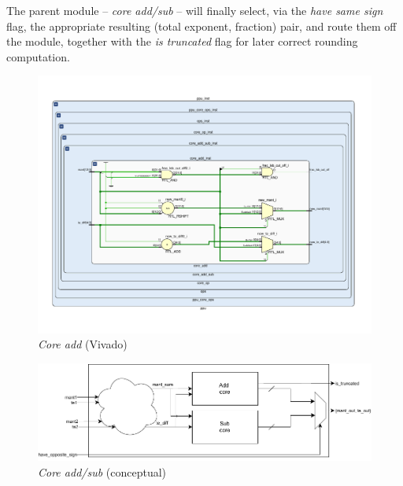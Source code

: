 The parent module -- \textit{core add/sub} -- will finally select, via the \textit{have same sign} flag, the appropriate resulting (total exponent, fraction) pair, and route them off the module, together with the \textit{is truncated} flag for later correct rounding computation.

\begin{figure}
    \centering
    \includegraphics[width=\textwidth]{figures/core_add_vivado.pdf}
    \caption{\textit{Core add} (Vivado)}
    \label{fig:core_add_vivado}
\end{figure}%
\begin{figure}
    \centering
    \includegraphics[width=\textwidth]{figures/add-sub-core.drawio.pdf}
    \caption{\textit{Core add/sub} (conceptual)}
    \label{fig:core_add_sub_schematic_conc}
\end{figure}%

